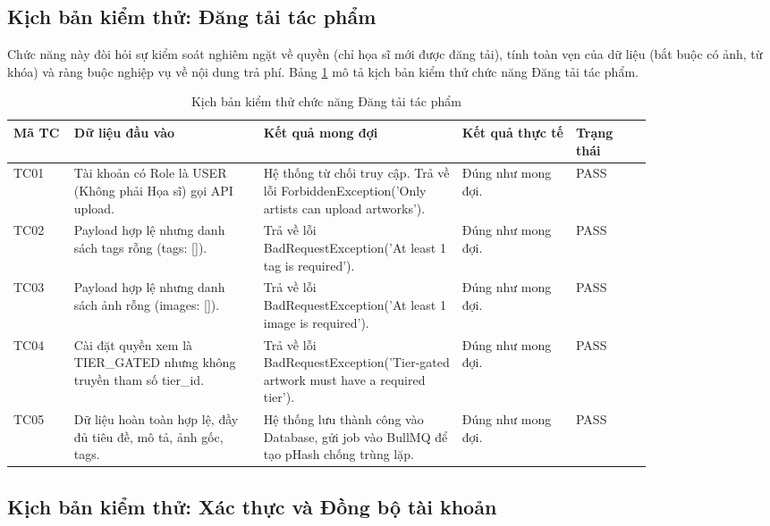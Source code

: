\subsection{Kịch bản kiểm thử: Đăng tải tác phẩm}

Chức năng này đòi hỏi sự kiểm soát nghiêm ngặt về quyền (chỉ họa sĩ mới được đăng tải), tính toàn vẹn của dữ liệu (bắt buộc có ảnh, từ khóa) và ràng buộc nghiệp vụ về nội dung trả phí. Bảng \ref{table:4_test_1} mô tả kịch bản kiểm thử chức năng Đăng tải tác phẩm.

\begin{table}[h!]
\caption{Kịch bản kiểm thử chức năng Đăng tải tác phẩm}
\label{table:4_test_1}
\centering
\small
\renewcommand{\arraystretch}{1.3}
\begin{tabular}{|p{0.08\linewidth}|p{0.25\linewidth}|p{0.25\linewidth}|p{0.15\linewidth}|p{0.1\linewidth}|}
\hline
\textbf{Mã TC} & \textbf{Dữ liệu đầu vào} & \textbf{Kết quả mong đợi} & \textbf{Kết quả thực tế} & \textbf{Trạng thái} \\ \hline
TC01 & Tài khoản có Role là USER (Không phải Họa sĩ) gọi API upload. & Hệ thống từ chối truy cập. Trả về lỗi ForbiddenException('Only artists can upload artworks'). & Đúng như mong đợi. & PASS \\ \hline
TC02 & Payload hợp lệ nhưng danh sách tags rỗng (tags: []). & Trả về lỗi BadRequestException('At least 1 tag is required'). & Đúng như mong đợi. & PASS \\ \hline
TC03 & Payload hợp lệ nhưng danh sách ảnh rỗng (images: []). & Trả về lỗi BadRequestException('At least 1 image is required'). & Đúng như mong đợi. & PASS \\ \hline
TC04 & Cài đặt quyền xem là TIER\_GATED nhưng không truyền tham số tier\_id. & Trả về lỗi BadRequestException('Tier-gated artwork must have a required tier'). & Đúng như mong đợi. & PASS \\ \hline
TC05 & Dữ liệu hoàn toàn hợp lệ, đầy đủ tiêu đề, mô tả, ảnh gốc, tags. & Hệ thống lưu thành công vào Database, gửi job vào BullMQ để tạo pHash chống trùng lặp. & Đúng như mong đợi. & PASS \\ \hline
\end{tabular}
\end{table}
\FloatBarrier

\subsection{Kịch bản kiểm thử: Xác thực và Đồng bộ tài khoản}

